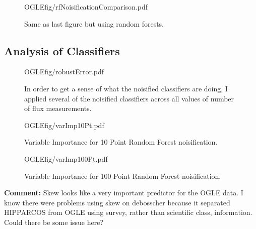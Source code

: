 \documentclass[10pt]{article}
\begin{document}
\begin{figure}[H]
  \begin{center}
    \begin{includegraphics}[height=4in,width=4in]{OGLEfig/rfNoisificationComparison.pdf}
      \caption{Same as last figure but using random forests.\label{fig:rfNoisificationComparisonOGLE}}
    \end{includegraphics}
  \end{center}
\end{figure}

\subsection{Analysis of Classifiers}

\begin{figure}[H]
  \begin{center}
    \begin{includegraphics}[height=4in,width=4in]{OGLEfig/robustError.pdf}
      \caption{In order to get a sense of what the noisified classifiers are doing, I applied several of the noisified classifiers across all values of number of flux measurements.\label{fig:robustErrorOGLE}}
    \end{includegraphics}
  \end{center}
\end{figure}




\begin{figure}[H]
  \begin{center}
    \begin{includegraphics}[height=4in,width=4in]{OGLEfig/varImp10Pt.pdf}
      \caption{Variable Importance for 10 Point Random Forest noisification.\label{fig:varImp10Pt}}
    \end{includegraphics}
    \end{center}
  \end{figure}
  
\begin{figure}[H]
  \begin{center}
    \begin{includegraphics}[height=4in,width=4in]{OGLEfig/varImp100Pt.pdf}
      \caption{Variable Importance for 100 Point Random Forest noisification.\label{fig:varImp100Pt}}
    \end{includegraphics}
    \end{center}
  \end{figure}
  

\textbf{Comment:} Skew looks like a very important predictor for the OGLE data. I know there were problems using skew on debosscher because it separated HIPPARCOS from OGLE using survey, rather than scientific class, information. Could there be some issue here?
\end{document}
